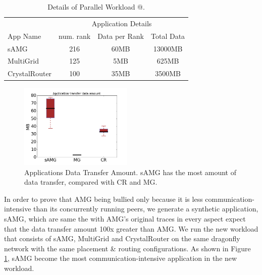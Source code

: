 \documentclass[conference,compsoc]{IEEEtran}
\makeatletter
\newcommand{\Rmnum}[1]{\expandafter\@slowromancap\romannumeral #1@}
\makeatother
\begin{document}
\begin{table}[ht]
\begin{center}
\caption{Details of Parallel Workload \Rmnum{2 }.} 
\label{tab: parallel workload-2}
\begin{tabular}{l c c c }
\toprule %
\toprule
&\multicolumn{3}{c}{Application Details} \\ %
\cmidrule(l){2-4}
App Name & num. rank & Data per Rank & Total Data\\ %
\midrule %
sAMG  &    216 &   60MB   &     13000MB\\ %
\midrule
MultiGrid  &    125 &   5MB   &     625MB\\ 
\midrule
CrystalRouter  &   100  &  35MB    &     3500MB\\ 

\midrule %
\bottomrule %
\end{tabular}
\end{center}
\end{table}


\begin{figure}[h!]
  \centering
  \includegraphics[width = 0.48\textwidth ]{syn-wkld/data_amount}
  \caption{Applications Data Transfer Amount. sAMG has the most amount of data transfer, compared with CR and MG.}
  \label{fig:syn-3app-data-amount}
\end{figure}

In order to prove that AMG being bullied only because it is less communication-intensive than its concurrently running peers, we generate a synthetic application, sAMG, which are same the with AMG's original traces in every aspect expect that the data transfer amount 100x greater than AMG. We run the new workload that consists of sAMG, MultiGrid and CrystalRouter on the same dragonfly network with the same placement \& routing configurations. As shown in Figure \ref{fig:syn-3app-data-amount}, sAMG become the most communication-intensive application in the new workload. 
\end{document}
